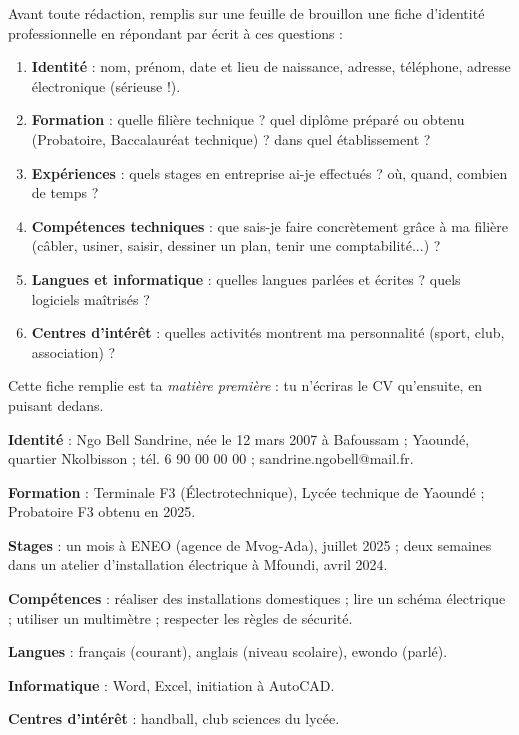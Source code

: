 \documentclass[11pt]{article}
\newcommand{\cle}[1]{{\popxbold\color{popdark}#1}}
\begin{document}
\begin{methode}
Avant toute rédaction, remplis sur une feuille de brouillon une \cle{fiche d'identité professionnelle} en répondant par écrit à ces questions :
\begin{enumerate}
\item \textbf{Identité} : nom, prénom, date et lieu de naissance, adresse, téléphone, adresse électronique (sérieuse !).
\item \textbf{Formation} : quelle filière technique ? quel diplôme préparé ou obtenu (Probatoire, Baccalauréat technique) ? dans quel établissement ?
\item \textbf{Expériences} : quels stages en entreprise ai-je effectués ? où, quand, combien de temps ?
\item \textbf{Compétences techniques} : que sais-je faire concrètement grâce à ma filière (câbler, usiner, saisir, dessiner un plan, tenir une comptabilité...) ?
\item \textbf{Langues et informatique} : quelles langues parlées et écrites ? quels logiciels maîtrisés ?
\item \textbf{Centres d'intérêt} : quelles activités montrent ma personnalité (sport, club, association) ?
\end{enumerate}
Cette fiche remplie est ta \emph{matière première} : tu n'écriras le CV qu'ensuite, en puisant dedans.
\end{methode}

\begin{exemplebox}
\textbf{Identité} : Ngo Bell Sandrine, née le 12 mars 2007 à Bafoussam ; Yaoundé, quartier Nkolbisson ; tél. 6 90 00 00 00 ; sandrine.ngobell@mail.fr.\par
\textbf{Formation} : Terminale F3 (Électrotechnique), Lycée technique de Yaoundé ; Probatoire F3 obtenu en 2025.\par
\textbf{Stages} : un mois à ENEO (agence de Mvog-Ada), juillet 2025 ; deux semaines dans un atelier d'installation électrique à Mfoundi, avril 2024.\par
\textbf{Compétences} : réaliser des installations domestiques ; lire un schéma électrique ; utiliser un multimètre ; respecter les règles de sécurité.\par
\textbf{Langues} : français (courant), anglais (niveau scolaire), ewondo (parlé).\par
\textbf{Informatique} : Word, Excel, initiation à AutoCAD.\par
\textbf{Centres d'intérêt} : handball, club sciences du lycée.
\end{exemplebox}
\end{document}
